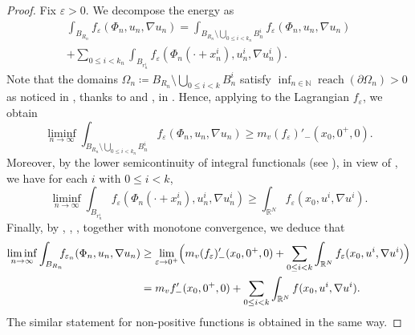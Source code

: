 \documentclass[10pt]{amsart}
\theoremstyle{plain}
\theoremstyle{definition}
\newcommand{\N}{\mathbb{N}}
\newcommand{\R}{\mathbb{R}}
\newcommand{\eps}{\varepsilon}
\DeclareMathOperator{\reach}{reach}
\let\oldbigcup\bigcup
\begin{document}
\begin{proof}
Fix \(\eps>0\). We decompose the energy as
\begin{multline}\label{lowerBoundExistence}
\int_{B_{R_n}}f_{\eps}(\Phi_n,u_n,\nabla u_n)
=
\int_{B_{R_n}\setminus \oldbigcup_{0\leq i<k_n}B^i_n}f_{\eps}(\Phi_n,u_n,\nabla u_n)\\
+
\sum_{0\leq i<k_n}\int_{B_{r^i_n}}f_{\eps}(\Phi_n(\cdot+x^i_n),u^i_n,\nabla u^i_n).
\end{multline}
Note that the domains \(\Omega_n\coloneqq B_{R_n}\setminus \oldbigcup_{0\leq i<k}B^i_n\) satisfy \(\inf_{n\in\N}\reach(\partial\Omega_n)>0\) as noticed in , thanks to  and ,  in . Hence, applying  to the Lagrangian \(f_\eps\), we obtain
\begin{equation}
\label{vanishingLowerBoundExistence}
\liminf_{n\to\infty}\int_{B_{R_n}\setminus \oldbigcup_{0\leq i<k_n}B^i_n}f_{\eps}(\Phi_n,u_n,\nabla u_n)
\geq m_v(f_\eps)'_-(x_0,0^+,0).
\end{equation}
Moreover, by the lower semicontinuity of integral functionals (see \cite[Th.\,4.1.1]{buttazzoSemicontinuityRelaxationIntegral1989}), in view of , we have for each \(i\) with \(0\leq i<k\),
\begin{equation}\label{lowerBoundButtazzo}
\liminf_{n\to\infty}
\int_{B_{r^i_n}}f_{\eps}(\Phi_n(\cdot+x^i_n),u^i_n,\nabla u^i_n)
\geq
\int_{\R^N}f_\eps(x_0,u^i,\nabla u^i).
\end{equation}
Finally, by , , ,  together with monotone convergence, we deduce that
\begin{align*}
\liminf_{n\to\infty}\int_{B_{R_n}}\hspace*{-2mm}f_{\eps_n}(\Phi_n,u_n,\nabla u_n)
&\geq
\lim_{\eps\to 0^+}\Bigl(
m_v (f_\eps)'_-(x_0,0^+,0)
+
\sum_{0\leq i<k}
\int_{\R^N}f_\eps(x_0,u^i,\nabla u^i)\Bigr)
\\
&=m_vf'_{-}(x_0,0^+,0)
+
\sum_{0\leq i<k}
\int_{\R^N}f(x_0,u^i,\nabla u^i).
\end{align*}
The similar statement for non-positive functions is obtained in the same way.
\end{proof}
\end{document}
